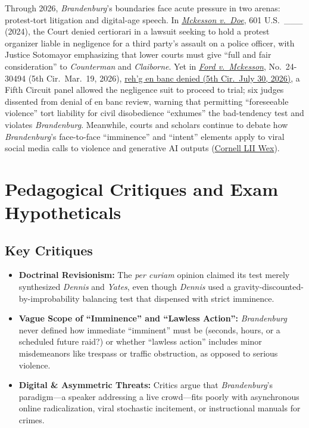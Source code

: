 \documentclass[12pt]{article}
\begin{document}
Through 2026, \emph{Brandenburg}'s boundaries face acute pressure in two arenas: protest-tort litigation and digital-age speech. In \href{https://www.supremecourt.gov/opinions/23pdf/23-373_8njq.pdf}{\emph{Mckesson v.\ Doe}}, 601 U.S.\ \_\_\_ (2024), the Court denied certiorari in a lawsuit seeking to hold a protest organizer liable in negligence for a third party's assault on a police officer, with Justice Sotomayor emphasizing that lower courts must give ``full and fair consideration'' to \emph{Counterman} and \emph{Claiborne}. Yet in \href{https://www.ca5.uscourts.gov/opinions/pub/24/24-30494-CV0.pdf}{\emph{Ford v.\ Mckesson}}, No.\ 24-30494 (5th Cir.\ Mar.\ 19, 2026), \href{https://www.ca5.uscourts.gov/opinions/pub/24/24-30494-CV1.pdf}{reh'g en banc denied (5th Cir.\ July 30, 2026)}, a Fifth Circuit panel allowed the negligence suit to proceed to trial; six judges dissented from denial of en banc review, warning that permitting ``foreseeable violence'' tort liability for civil disobedience ``exhumes'' the bad-tendency test and violates \emph{Brandenburg}. Meanwhile, courts and scholars continue to debate how \emph{Brandenburg}'s face-to-face ``imminence'' and ``intent'' elements apply to viral social media calls to violence and generative AI outputs (\href{https://www.law.cornell.edu/wex/imminent_lawless_action}{Cornell LII Wex}).

\section{Pedagogical Critiques and Exam Hypotheticals}

\subsection*{Key Critiques}
\begin{itemize}
  \item \textbf{Doctrinal Revisionism:} The \emph{per curiam} opinion claimed its test merely synthesized \emph{Dennis} and \emph{Yates}, even though \emph{Dennis} used a gravity-discounted-by-improbability balancing test that dispensed with strict imminence.
  \item \textbf{Vague Scope of ``Imminence'' and ``Lawless Action'':} \emph{Brandenburg} never defined how immediate ``imminent'' must be (seconds, hours, or a scheduled future raid?) or whether ``lawless action'' includes minor misdemeanors like trespass or traffic obstruction, as opposed to serious violence.
  \item \textbf{Digital \& Asymmetric Threats:} Critics argue that \emph{Brandenburg}'s paradigm---a speaker addressing a live crowd---fits poorly with asynchronous online radicalization, viral stochastic incitement, or instructional manuals for crimes.
\end{itemize}
\end{document}
